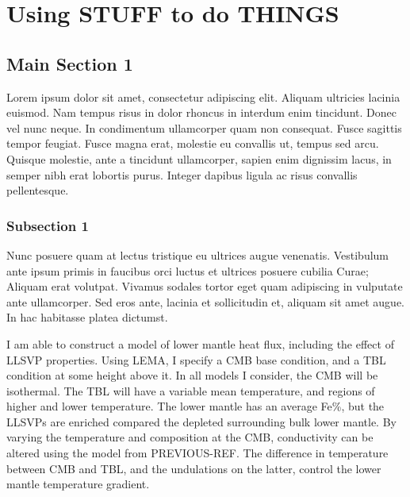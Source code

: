 
\chapter{Using STUFF to do THINGS} %

\label{Chapter5} %

\section{Main Section 1}

Lorem ipsum dolor sit amet, consectetur adipiscing elit. Aliquam ultricies lacinia euismod. Nam tempus risus in dolor rhoncus in interdum enim tincidunt. Donec vel nunc neque. In condimentum ullamcorper quam non consequat. Fusce sagittis tempor feugiat. Fusce magna erat, molestie eu convallis ut, tempus sed arcu. Quisque molestie, ante a tincidunt ullamcorper, sapien enim dignissim lacus, in semper nibh erat lobortis purus. Integer dapibus ligula ac risus convallis pellentesque.

\subsection{Subsection 1}

Nunc posuere quam at lectus tristique eu ultrices augue venenatis. Vestibulum ante ipsum primis in faucibus orci luctus et ultrices posuere cubilia Curae; Aliquam erat volutpat. Vivamus sodales tortor eget quam adipiscing in vulputate ante ullamcorper. Sed eros ante, lacinia et sollicitudin et, aliquam sit amet augue. In hac habitasse platea dictumst.




I am able to construct a model of lower mantle heat flux, including the effect of LLSVP properties. Using LEMA, I specify a CMB base condition, and a TBL condition at some height above it. In all models I consider, the CMB will be isothermal. The TBL will have a variable mean temperature, and regions of higher and lower temperature. The lower mantle has an average Fe\%, but the LLSVPs are enriched compared the depleted surrounding bulk lower mantle. By varying the temperature and composition at the CMB, conductivity can be altered using the model from PREVIOUS-REF. The difference in temperature between CMB and TBL, and the undulations on the latter, control the lower mantle temperature gradient. 

